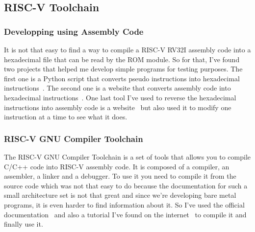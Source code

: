 \subsection{RISC-V Toolchain}
\subsubsection{Developping using Assembly Code}
It is not that easy to find a way to compile a RISC-V RV32I assembly code into a hexadecimal file 
that can be read by the ROM module. So for that, I've found two projects that helped me 
develop simple programs for testing purposes. The first one is a Python script that converts
pseudo instructions into hexadecimal instructions~\cite{riscv_python_assembler}. The second one is a
website that converts assembly code into hexadecimal instructions~\cite{riscv_online_assembler}.
One last tool I've used to reverse the hexadecimal instructions into assembly code is a website~\cite{riscv_online_encoder_decoder} but 
also used it to modify one instruction at a time to see what it does.

\subsubsection{RISC-V GNU Compiler Toolchain}
The RISC-V GNU Compiler Toolchain is a set of tools that allows you to compile C/C++ code into
RISC-V assembly code. It is composed of a compiler, an assembler, a linker and a debugger. To use it 
you need to compile it from the source code which was not that easy to do because the documentation for
such a small architecture set is not that great and since we're developing bare metal programs, it is even
harder to find information about it. So I've used the official documentation~\cite{riscv_gnu_toolchain} and
also a tutorial I've found on the internet~\cite{riscv_gnu_toolchain_baremetal_tutorials} to compile it and finally use 
it.